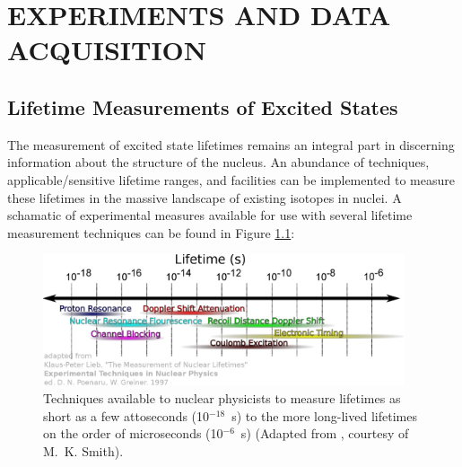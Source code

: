 %
%

\chapter{EXPERIMENTS AND DATA ACQUISITION}

\section{Lifetime Measurements of Excited States}\label{sec:lifetime_measurement_techniques}
The measurement of excited state lifetimes remains an integral part in discerning information about the structure of the nucleus. An abundance of techniques, applicable/sensitive lifetime ranges, and facilities can be implemented to measure these lifetimes in the massive landscape of existing isotopes in nuclei. A schamatic of experimental measures available for use with several lifetime measurement techniques can be found in Figure \ref{fig:VariousLifetimeMeasurements}:

\begin{figure}[h!] 
\begin{center}
\includegraphics[width=0.95\textwidth]{figures/lifetimes-techniques-full.eps}
\caption{Techniques available to nuclear physicists to measure lifetimes as short as a few attoseconds (10$^{-18}$~s) to the more long-lived lifetimes on the order of microseconds (10$^{-6}$~s) (Adapted from \cite{Poenaru_text}, courtesy of M.~K. Smith).}
\label{fig:VariousLifetimeMeasurements}
\end{center}
\end{figure}

